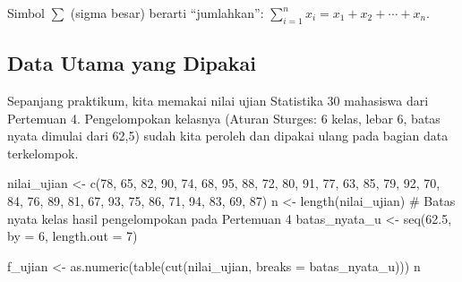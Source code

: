 \documentclass[
  indonesian,
  letterpaper,
]{book}
\newenvironment{Shaded}{\begin{snugshade}}{\end{snugshade}}
\newcommand{\AttributeTok}[1]{\textcolor[rgb]{0.40,0.45,0.13}{#1}}
\newcommand{\CommentTok}[1]{\textcolor[rgb]{0.37,0.37,0.37}{#1}}
\newcommand{\DecValTok}[1]{\textcolor[rgb]{0.68,0.00,0.00}{#1}}
\newcommand{\FloatTok}[1]{\textcolor[rgb]{0.68,0.00,0.00}{#1}}
\newcommand{\FunctionTok}[1]{\textcolor[rgb]{0.28,0.35,0.67}{#1}}
\newcommand{\NormalTok}[1]{\textcolor[rgb]{0.00,0.23,0.31}{#1}}
\newcommand{\OtherTok}[1]{\textcolor[rgb]{0.00,0.23,0.31}{#1}}
\begin{document}
Simbol \(\sum\) (sigma besar) berarti ``jumlahkan'':
\(\sum_{i=1}^{n} x_i = x_1 + x_2 + \cdots + x_n\).

\subsection{Data Utama yang Dipakai}\label{data-utama-yang-dipakai}

Sepanjang praktikum, kita memakai nilai ujian Statistika 30 mahasiswa
dari Pertemuan 4. Pengelompokan kelasnya (Aturan Sturges: 6 kelas, lebar
6, batas nyata dimulai dari 62,5) sudah kita peroleh dan dipakai ulang
pada bagian data terkelompok.

\begin{Shaded}
\begin{Highlighting}[]
\NormalTok{nilai\_ujian }\OtherTok{\textless{}{-}} \FunctionTok{c}\NormalTok{(}\DecValTok{78}\NormalTok{, }\DecValTok{65}\NormalTok{, }\DecValTok{82}\NormalTok{, }\DecValTok{90}\NormalTok{, }\DecValTok{74}\NormalTok{, }\DecValTok{68}\NormalTok{, }\DecValTok{95}\NormalTok{, }\DecValTok{88}\NormalTok{, }\DecValTok{72}\NormalTok{, }\DecValTok{80}\NormalTok{,}
\DecValTok{91}\NormalTok{, }\DecValTok{77}\NormalTok{, }\DecValTok{63}\NormalTok{, }\DecValTok{85}\NormalTok{, }\DecValTok{79}\NormalTok{, }\DecValTok{92}\NormalTok{, }\DecValTok{70}\NormalTok{, }\DecValTok{84}\NormalTok{, }\DecValTok{76}\NormalTok{, }\DecValTok{89}\NormalTok{,}
\DecValTok{81}\NormalTok{, }\DecValTok{67}\NormalTok{, }\DecValTok{93}\NormalTok{, }\DecValTok{75}\NormalTok{, }\DecValTok{86}\NormalTok{, }\DecValTok{71}\NormalTok{, }\DecValTok{94}\NormalTok{, }\DecValTok{83}\NormalTok{, }\DecValTok{69}\NormalTok{, }\DecValTok{87}\NormalTok{)}
\NormalTok{n }\OtherTok{\textless{}{-}} \FunctionTok{length}\NormalTok{(nilai\_ujian)}
\CommentTok{\# Batas nyata kelas hasil pengelompokan pada Pertemuan 4}
\NormalTok{batas\_nyata\_u }\OtherTok{\textless{}{-}} \FunctionTok{seq}\NormalTok{(}\FloatTok{62.5}\NormalTok{, }\AttributeTok{by =} \DecValTok{6}\NormalTok{, }\AttributeTok{length.out =} \DecValTok{7}\NormalTok{)}
\end{Highlighting}
\end{Shaded}

\begin{Shaded}
\begin{Highlighting}[]
\NormalTok{f\_ujian }\OtherTok{\textless{}{-}} \FunctionTok{as.numeric}\NormalTok{(}\FunctionTok{table}\NormalTok{(}\FunctionTok{cut}\NormalTok{(nilai\_ujian, }\AttributeTok{breaks =}\NormalTok{ batas\_nyata\_u)))}
\NormalTok{n}
\end{Highlighting}
\end{Shaded}
\end{document}
